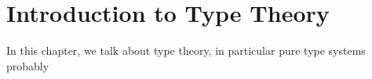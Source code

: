\chapter{Introduction to Type Theory}

In this chapter, we talk about type theory, in particular pure type systems probably


